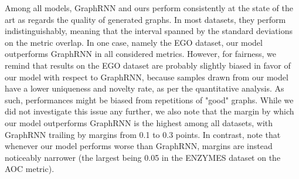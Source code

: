 Among all models, GraphRNN and ours perform consistently at the state of the art as regards the quality of generated graphs. In most datasets, they perform indistinguishably, meaning that the interval spanned by the standard deviations on the metric overlap. In one case, namely the EGO dataset, our model outperforms GraphRNN in all considered metrics. However, for fairness, we remind that results on the EGO dataset are probably slightly biased in favor of our model with respect to GraphRNN, because samples drawn from our model have a lower uniqueness and novelty rate, as per the quantitative analysis. As such, performances might be biased from repetitions of "good" graphs. While we did not investigate this issue any further, we also note that the margin by which our model outperforms GraphRNN is the highest among all datasets, with GraphRNN trailing by margins from 0.1 to 0.3 points. In contrast, note that whenever our model performs worse than GraphRNN, margins are instead noticeably narrower (the largest being 0.05 in the ENZYMES dataset on the AOC metric).

